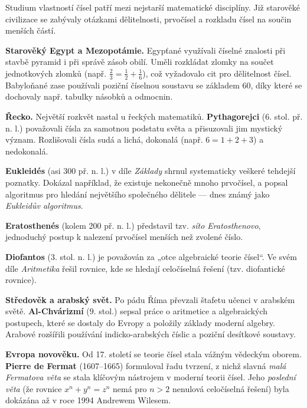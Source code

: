 \documentclass[12pt,a4paper]{article}
\begin{document}
\begin{historicalbox}
Studium vlastností čísel patří mezi nejstarší matematické disciplíny. Již starověké civilizace se zabývaly otázkami dělitelnosti, prvočísel a rozkladu čísel na součin menších částí.

\smallskip
\textbf{Starověký Egypt a Mezopotámie.}  
Egypťané využívali číselné znalosti při stavbě pyramid i při správě zásob obilí. Uměli rozkládat zlomky na součet jednotkových zlomků (např. $\tfrac{2}{3} = \tfrac{1}{2} + \tfrac{1}{6}$), což vyžadovalo cit pro dělitelnost čísel. Babyloňané zase používali poziční číselnou soustavu se základem $60$, díky které se dochovaly např. tabulky násobků a odmocnin.

\smallskip
\textbf{Řecko.}  
Největší rozkvět nastal u řeckých matematiků. \textbf{Pythagorejci} (6. stol. př. n. l.) považovali čísla za samotnou podstatu světa a přisuzovali jim mystický význam. Rozlišovali čísla sudá a lichá, dokonalá (např. $6 = 1+2+3$) a nedokonalá.  

\smallskip
\textbf{Eukleidés} (asi 300 př. n. l.) v díle \emph{Základy} shrnul systematicky veškeré tehdejší poznatky. Dokázal například, že existuje nekonečně mnoho prvočísel, a popsal algoritmus pro hledání největšího společného dělitele — dnes známý jako \emph{Eukleidův algoritmus}.  

\smallskip
\textbf{Eratosthenés} (kolem 200 př. n. l.) představil tzv. \emph{síto Eratosthenovo}, jednoduchý postup k nalezení prvočísel menších než zvolené číslo.  

\smallskip
\textbf{Diofantos} (3. stol. n. l.) je považován za „otce algebraické teorie čísel“. Ve svém díle \emph{Aritmetika} řešil rovnice, kde se hledají celočíselná řešení (tzv. diofantické rovnice).

\smallskip

\smallskip

\smallskip

\smallskip

\smallskip

\smallskip

\smallskip
\textbf{Středověk a arabský svět.}  
Po pádu Říma převzali štafetu učenci v arabském světě. \textbf{Al-Chvárizmí} (9. stol.) sepsal práce o aritmetice a algebraických postupech, které se dostaly do Evropy a položily základy moderní algebry. Arabové rozšířili používání indicko-arabských číslic a poziční desítkové soustavy.

\smallskip
\textbf{Evropa novověku.}  
Od 17. století se teorie čísel stala vážným vědeckým oborem. \textbf{Pierre de Fermat} (1607–1665) formuloval řadu tvrzení, z nichž slavná \emph{malá Fermatova věta} se stala klíčovým nástrojem v moderní teorii čísel. Jeho \emph{poslední věta} (že rovnice $x^n+y^n=z^n$ nemá pro $n>2$ nenulová celočíselná řešení) byla dokázána až v roce 1994 Andrewem Wilesem.  


\end{historicalbox}
\end{document}
